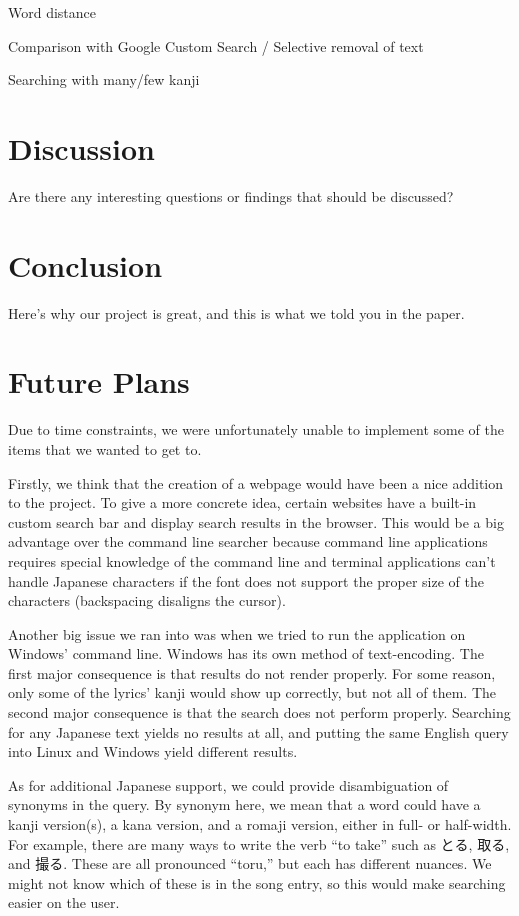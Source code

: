 \documentclass{acm} %
\begin{document}
\begin{CJK}{UTF8}{zhsong}
Word distance

Comparison with Google Custom Search / Selective removal of text

Searching with many/few kanji

\section{Discussion}

Are there any interesting questions or findings that should be discussed?

\section{Conclusion}

Here's why our project is great, and this is what we told you in the paper.

\section{Future Plans}

Due to time constraints, we were unfortunately unable to implement some of the items that we wanted to get to.

Firstly, we think that the creation of a webpage would have been a nice addition to the project. To give a more concrete idea, certain websites have a built-in custom search bar and display search results in the browser. This would be a big advantage over the command line searcher because command line applications requires special knowledge of the command line and terminal applications can't handle Japanese characters if the font does not support the proper size of the characters (backspacing disaligns the cursor).

Another big issue we ran into was when we tried to run the application on Windows' command line. Windows has its own method of text-encoding. The first major consequence is that results do not render properly. For some reason, only some of the lyrics' kanji would show up correctly, but not all of them. The second major consequence is that the search does not perform properly. Searching for any Japanese text yields no results at all, and putting the same English query into Linux and Windows yield different results.

As for additional Japanese support, we could provide disambiguation of synonyms in the query. By synonym here, we mean that a word could have a kanji version(s), a kana version, and a romaji version, either in full- or half-width. For example, there are many ways to write the verb ``to take'' such as とる, 取る, and 撮る. These are all pronounced ``toru,'' but each has different nuances. We might not know which of these is in the song entry, so this would make searching easier on the user.


\end{CJK}
\end{document}
